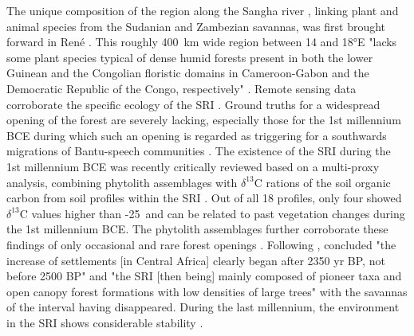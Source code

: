 \documentclass[smallextended,natbib]{svjour3}       %
\begin{document}
The unique composition of the region along the Sangha river \citep[cf. "W~\&~E margins" in][7 Fig.~3A]{Philippon.2019}, linking plant and animal species from the Sudanian and Zambezian savannas, was first brought forward in René \citet{Letouzey.1968}. This roughly 400~km wide region between 14 and 18°E "lacks some plant species typical of dense humid forests present in both the lower Guinean and the Congolian floristic domains in Cameroon-Gabon and the Democratic Republic of the Congo, respectively" \citep[356]{Bostoen.2015}. Remote sensing data corroborate the specific ecology of the SRI \citep{Gond.2013,Philippon.2019}. Ground truths for a widespread opening of the forest are severely lacking, especially those for the 1st millennium BCE during which such an opening is regarded as triggering for a southwards migrations of Bantu-speech communities \citep{Grollemund.2015,Bostoen.2015}. The existence of the SRI during the 1st millennium BCE was recently critically reviewed based on a multi-proxy analysis, combining phytolith assemblages with $\delta^{13}$C rations of the soil organic carbon from soil profiles within the SRI \citep{Bremond.2017}. Out of all 18 profiles, only four showed $\delta^{13}$C values higher than -25\textperthousand\ and can be related to past vegetation changes during the 1st millennium BCE. The phytolith assemblages further corroborate these findings of only occasional and rare forest openings \citep[99]{Bremond.2017}. Following \citet{Bremond.2017}, \citep[1]{Giresse.2020} concluded "the increase of settlements [in Central Africa] clearly began after 2350 yr BP, not before 2500 BP" and "the SRI [then being] mainly composed of pioneer taxa and open canopy forest formations with low densities of large trees" \citep[11]{Giresse.2020} with the savannas of the interval having disappeared. During the last millennium, the environment in the SRI shows considerable stability \citep{Giresse.2023}.
\end{document}
